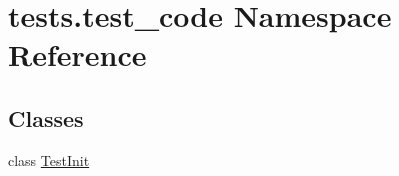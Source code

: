 \hypertarget{namespacetests_1_1test__code}{}\section{tests.\+test\+\_\+code Namespace Reference}
\label{namespacetests_1_1test__code}
\subsection*{Classes}
\begin{DoxyCompactItemize}
\item 
class \hyperlink{classtests_1_1test__code_1_1TestInit}{Test\+Init}
\end{DoxyCompactItemize}
